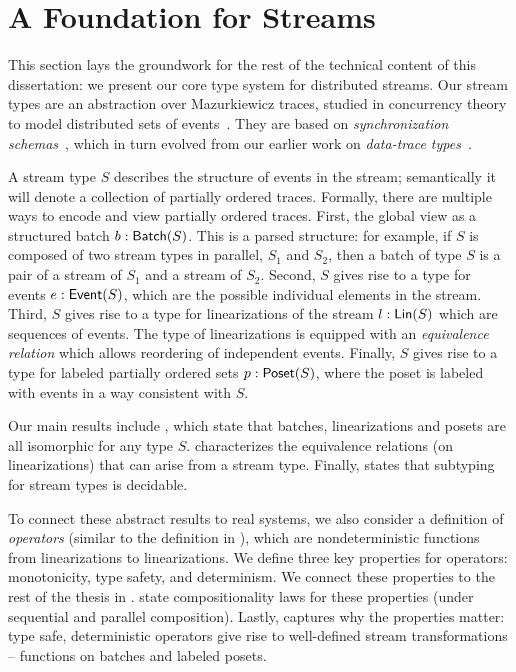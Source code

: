 \chapter{A Foundation for Streams}
\label{cha:foundation}

This section lays the groundwork for the rest of the technical content of this dissertation: we present our core type system for distributed streams.
Our stream types are an abstraction over Mazurkiewicz traces, studied in concurrency theory to model distributed sets of events~\cite{mazurkiewicz1986trace,DiekertR1995}.
They are based on \emph{synchronization schemas}~, which in turn evolved from our earlier work on \emph{data-trace types}~.

A stream type $S$ describes the structure of events in the stream;
semantically it will denote a collection of partially ordered traces.
Formally, there are multiple ways to encode and view partially ordered traces.
First, the global view as a structured batch $b: \mathsf{Batch}({S})$.
This is a parsed structure: for example, if $S$ is composed of two stream types in parallel, $S_1$ and $S_2$, then a batch of type $S$ is a pair of a stream of $S_1$ and a stream of $S_2$.
Second, $S$ gives rise to a type for events $e: \mathsf{Event}({S})$,
which are the possible individual elements in the stream.
Third, $S$ gives rise to a type for linearizations of the stream $l: \mathsf{Lin}({S})$
which are sequences of events.
The type of linearizations is equipped with an \emph{equivalence relation}
which allows reordering of independent events.
Finally, $S$ gives rise to a type for labeled partially ordered sets $p: \mathsf{Poset}({S})$, where the poset is labeled with events in a way consistent with $S$.

Our main results include , which state that batches, linearizations and posets are all isomorphic for any type $S$.
 characterizes the equivalence relations (on linearizations) that can arise from a stream type.
Finally,  states that subtyping for stream types is decidable.

To connect these abstract results to real systems, we also consider a definition of \emph{operators} (similar to the definition in ), which are nondeterministic functions from linearizations to linearizations.
We define three key properties for operators: monotonicity, type safety, and determinism. We connect these properties to the rest of the thesis in .
 state compositionality laws for these properties (under sequential and parallel composition).
Lastly, 
captures why the properties matter: type safe, deterministic operators give rise to well-defined stream transformations -- functions on batches and labeled posets.

